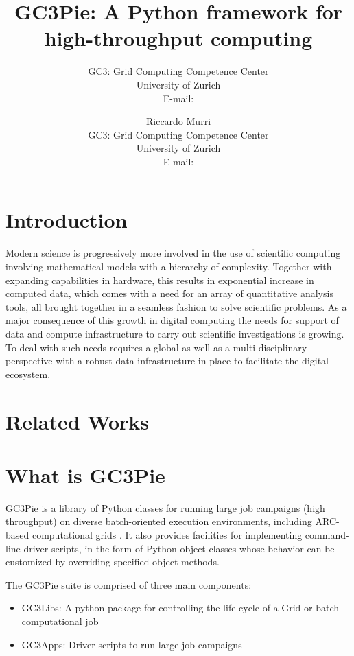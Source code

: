 \documentclass{PoS}
\title{GC3Pie: A Python framework for high-throughput computing}
\author{\speaker{Sergio MAFFIOLETTI}%
        GC3: Grid Computing Competence Center\\
        University of Zurich \\
         E-mail: \email{sergio.maffioletti@gc3.uzh.ch}}
\author{Riccardo Murri\\
        GC3: Grid Computing Competence Center\\
        University of Zurich \\
        E-mail: \email{riccardo.murri@gmail.com}}
\begin{document}
\section{Introduction}
Modern science is progressively more involved in the use of scientific
computing involving mathematical models with a hierarchy of
complexity. Together with expanding capabilities in hardware, this
results in exponential increase in computed data, which comes with a
need for an array of quantitative analysis tools,
all brought together in a seamless fashion to solve scientific
problems. As a major consequence of this growth in digital computing
the needs for support of data and compute infrastructure to carry out
scientific investigations is growing.  To deal with such needs
requires a global as well as a multi-disciplinary perspective with a
robust data infrastructure in place to facilitate the digital
ecosystem. 



\section{Related Works}

\section{What is GC3Pie}
GC3Pie is a library of Python classes for running large job campaigns
(high throughput) on diverse batch-oriented execution environments,
including \acs{ARC}-based computational grids \cite{arc}.  It also
provides facilities for implementing command-line driver scripts, in
the form of Python object classes whose behavior can be customized by
overriding specified object methods.

The GC3Pie suite is comprised of three main components: 

\begin{itemize}
\item GC3Libs: A python package for controlling the life-cycle of a Grid or batch computational job 
\item GC3Apps: Driver scripts to run large job campaigns 
\end{itemize}
\end{document}
